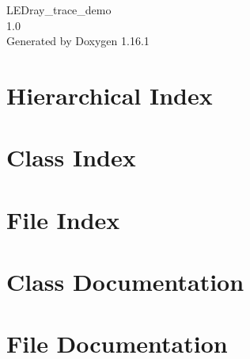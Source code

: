 \documentclass[twoside]{book}
\newcommand{\+}{\discretionary{\mbox{\scriptsize$\hookleftarrow$}}{}{}}
\newcommand{\clearemptydoublepage}{%
    \newpage{\pagestyle{empty}\cleardoublepage}%
  }
\begin{document}
  \raggedbottom
    \hypersetup{pageanchor=false,
                bookmarksnumbered=true,
                pdfencoding=unicode
               }
  \begin{titlepage}
  \vspace*{7cm}
  \begin{center}%
  {\Large LEDray\+\_\+trace\+\_\+demo}\\
  [1ex]\large 1.\+0 \\
  \vspace*{1cm}
  {\large Generated by Doxygen 1.16.1}\\
  \end{center}
  \end{titlepage}
  \clearemptydoublepage
  \tableofcontents
  \clearemptydoublepage
  \hypersetup{pageanchor=true}
\chapter{Hierarchical Index}

\chapter{Class Index}

\chapter{File Index}

\chapter{Class Documentation}














\chapter{File Documentation}

















  \backmatter
  \newpage
  \clearemptydoublepage
  \printindex
\end{document}
